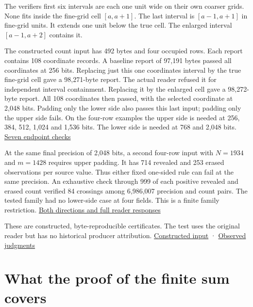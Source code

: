 The verifier\textquotesingle s first six intervals are each one unit wide on their own coarser grids. None fits inside the fine-grid cell \([a,a+1]\). The last interval is \([a-1,a+1]\) in fine-grid units. It extends one unit below the true cell. The enlarged interval \([a-1,a+2]\) contains it.

The constructed count input has 492 bytes and four occupied rows. Each report contains 108 coordinate records. A baseline report of 97,191 bytes passed all coordinates at 256 bits. Replacing just this one coordinate\textquotesingle s interval by the true fine-grid cell gave a 98,271-byte report. The actual reader refused it for independent interval containment. Replacing it by the enlarged cell gave a 98,272-byte report. All 108 coordinates then passed, with the selected coordinate at 2,048 bits. Padding only the lower side also passes this last input; padding only the upper side fails. On the four-row examples the upper side is needed at 256, 384, 512, 1,024 and 1,536 bits. The lower side is needed at 768 and 2,048 bits. \href{https://github.com/sepahead/pid-rs/blob/main/audit/research/signed-log-certificate-enclosure/counted-examples/directed/SEVEN-GRID-SIDES.json}{Seven endpoint checks}

At the same final precision of 2,048 bits, a second four-row input with \(N=1934\) and \(m=1428\) requires upper padding. It has 714 revealed and 253 erased observations per source value. Thus either fixed one-sided rule can fail at the same precision. An exhaustive check through 999 of each positive revealed and erased count verified 84 crossings among 6,986,007 precision and count pairs. The tested family had no lower-side case at four fields. This is a finite family restriction. \href{https://github.com/sepahead/pid-rs/blob/main/audit/research/signed-log-certificate-enclosure/counted-examples/directed/BOTH-SIDES-CENSUS.json}{Both directions and full reader responses}

These are constructed, byte-reproducible certificates. The test uses the original reader but has no historical producer attribution. \href{https://github.com/sepahead/pid-rs/blob/main/audit/research/signed-log-certificate-enclosure/counted-examples/constructed/synthetic-B.json}{Constructed input} · \href{https://github.com/sepahead/pid-rs/blob/main/audit/research/signed-log-certificate-enclosure/counted-examples/TRUE-CELLS.json}{Observed judgments}

\clearpage

\section{What the proof of the finite sum covers}\label{what-the-proof-of-the-finite-sum-covers}

